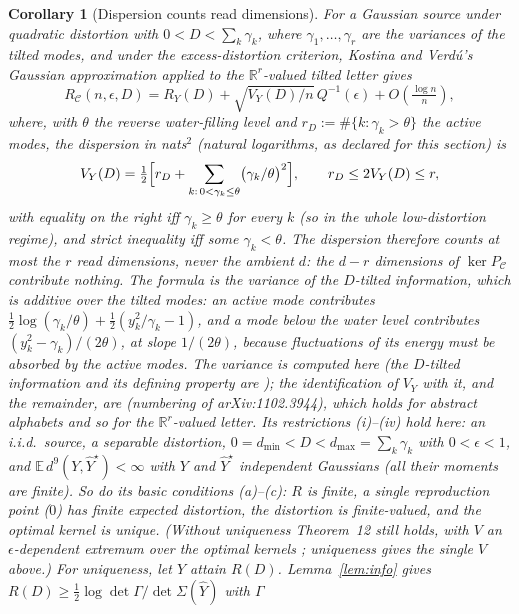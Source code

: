 \documentclass[11pt]{article}
\newtheorem{corollary}{Corollary}
\theoremstyle{definition}
\theoremstyle{remark}
\newcommand{\PC}{P_{\mathcal{C}}}
\newcommand{\E}{\mathbb{E}}
\begin{document}
\begin{corollary}[Dispersion counts read dimensions]\label{cor:dispersion}
For a Gaussian source under quadratic distortion with $0<D<\sum_k\gamma_k$, where
$\gamma_1,\dots,\gamma_r$ are the variances of the tilted modes, and under the
excess-distortion criterion, Kostina and Verd\'u's Gaussian approximation
\cite[Thm.~12]{kostinaverdu2012} applied to the $\mathbb R^r$-valued tilted letter gives
\[
R_{\mathcal C}(n,\epsilon,D)=R_Y(D)+\sqrt{V_Y(D)/n}\,Q^{-1}(\epsilon)+O\!\left(\tfrac{\log n}{n}\right),
\]
where, with $\theta$ the reverse water-filling level and $r_D:=\#\{k:\gamma_k>\theta\}$ the
active modes, the dispersion in nats$^2$ (natural logarithms, as declared for this section) is
\[
V_Y(D)=\tfrac12\Bigl[r_D+\sum_{k:\,0<\gamma_k\le\theta}\bigl(\gamma_k/\theta\bigr)^2\Bigr],
\qquad r_D\le 2V_Y(D)\le r ,
\]
with equality on the right iff $\gamma_k\ge\theta$ for every $k$ (so in the whole
low-distortion regime), and strict inequality iff some $\gamma_k<\theta$. The dispersion
therefore counts at most the $r$ read dimensions, never the ambient $d$: the $d-r$
dimensions of $\ker\PC$ contribute nothing. The formula is the variance of the $D$-tilted
information, which is additive over the tilted modes: an active mode contributes
$\tfrac12\log(\gamma_k/\theta)+\tfrac12(y_k^2/\gamma_k-1)$, and a mode below the water level
contributes $(y_k^2-\gamma_k)/(2\theta)$, at slope $1/(2\theta)$, because fluctuations of
its energy must be absorbed by the active modes. The variance is computed here (the
$D$-tilted information and its defining property are \cite[Def.~6, Property~2]{kostinaverdu2012});
the identification of $V_Y$ with it, and the remainder, are \cite[Thm.~12]{kostinaverdu2012}
(numbering of arXiv:1102.3944), which holds for abstract alphabets and so for the
$\mathbb R^r$-valued letter. Its restrictions (i)--(iv) hold here: an i.i.d.\ source, a
separable distortion, $0=d_{\min}<D<d_{\max}=\sum_k\gamma_k$ with $0<\epsilon<1$, and
$\E\,d^9(Y,\hat Y^\star)<\infty$ with $Y$ and $\hat Y^\star$ independent Gaussians (all their
moments are finite). So do its basic conditions (a)--(c): $R$ is finite, a single
reproduction point ($0$) has finite expected distortion, the distortion is finite-valued,
and the optimal kernel is unique. (Without uniqueness Theorem~12 still holds, with $V$ an
$\epsilon$-dependent extremum over the optimal kernels \cite[Remark~9]{kostinaverdu2012};
uniqueness gives the single $V$ above.) For uniqueness, let $\hat Y$ attain $R(D)$.
Lemma~\ref{lem:info} gives $R(D)\ge\tfrac12\log\det\Gamma/\det\Sigma(\hat Y)$ with $\Gamma$

\end{corollary}
\end{document}
